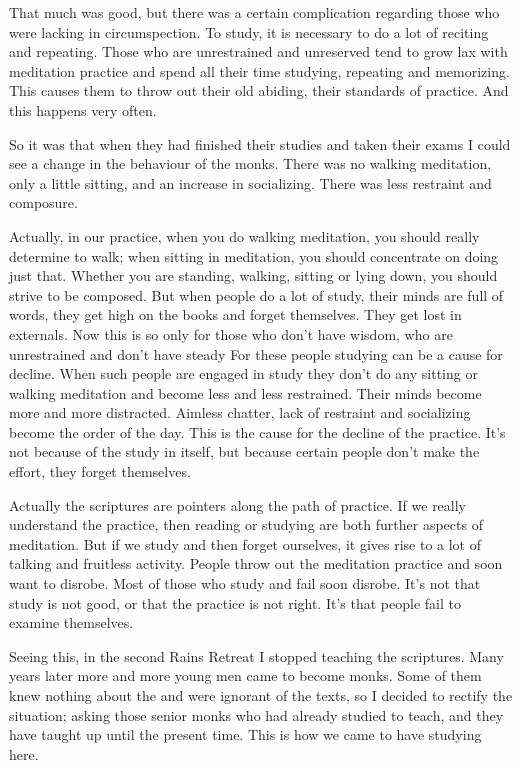 That much was good, but there was a certain complication regarding those who were lacking in circumspection. To study, it is necessary to do a lot of reciting and repeating. Those who are unrestrained and unreserved tend to grow lax with meditation practice and spend all their time studying, repeating and memorizing. This causes them to throw out their old abiding, their standards of practice. And this happens very often.

So it was that when they had finished their studies and taken their exams I could see a change in the behaviour of the monks. There was no walking meditation, only a little sitting, and an increase in socializing. There was less restraint and composure.

Actually, in our practice, when you do walking meditation, you should really determine to walk; when sitting in meditation, you should concentrate on doing just that. Whether you are standing, walking, sitting or lying down, you should strive to be composed. But when people do a lot of study, their minds are full of words, they get high on the books and forget themselves. They get lost in externals. Now this is so only for those who don't have wisdom, who are unrestrained and don't have steady  For these people studying can be a cause for decline. When such people are engaged in study they don't do any sitting or walking meditation and become less and less restrained. Their minds become more and more distracted. Aimless chatter, lack of restraint and socializing become the order of the day. This is the cause for the decline of the practice. It's not because of the study in itself, but because certain people don't make the effort, they forget themselves.

Actually the scriptures are pointers along the path of practice. If we really understand the practice, then reading or studying are both further aspects of meditation. But if we study and then forget ourselves, it gives rise to a lot of talking and fruitless activity. People throw out the meditation practice and soon want to disrobe. Most of those who study and fail soon disrobe. It's not that study is not good, or that the practice is not right. It's that people fail to examine themselves.

Seeing this, in the second Rains Retreat I stopped teaching the scriptures. Many years later more and more young men came to become monks. Some of them knew nothing about the  and were ignorant of the texts, so I decided to rectify the situation; asking those senior monks who had already studied to teach, and they have taught up until the present time. This is how we came to have studying here.

